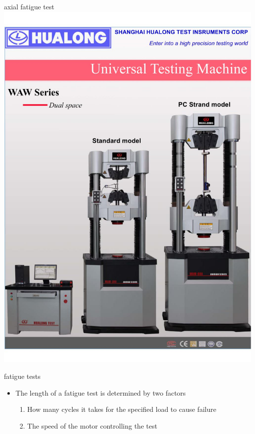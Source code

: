\documentclass[
  letterpaper,
  ignorenonframetext,
  aspectratio=43,
  handout,
  12pt]{beamer}
\providecommand{\tightlist}{%
  \setlength{\itemsep}{0pt}\setlength{\parskip}{0pt}}
\providecommand{\tightlist}{%
\setlength{\itemsep}{0pt}\setlength{\parskip}{0pt}}
\let\Oldincludegraphics\includegraphics
\renewcommand{\includegraphics}[2][]{\Oldincludegraphics[width=\textwidth,height=0.7\textheight,keepaspectratio]{#2}}
\begin{document}
\begin{frame}{axial fatigue test}
\protect\hypertarget{axial-fatigue-test}{}
\includegraphics{../images/servohydraulic.jpg}
\end{frame}

\begin{frame}{fatigue tests}
\protect\hypertarget{fatigue-tests-2}{}
\begin{itemize}
\tightlist
\item
  The length of a fatigue test is determined by two factors

  \begin{enumerate}
  \tightlist
  \item
    How many cycles it takes for the specified load to cause failure
  \item
    The speed of the motor controlling the test
  \end{enumerate}
\end{itemize}
\end{frame}
\end{document}
